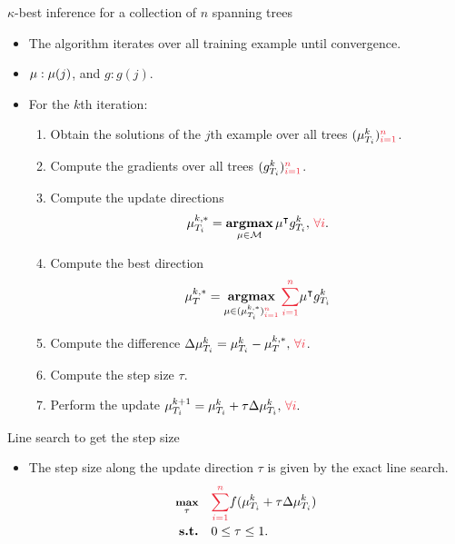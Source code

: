 \documentclass[first=dgreen,second=purple,logo=yellowexc]{aaltoslides}
\begin{document}
\begin{frame}{$\kappa$-best inference for a collection of $n$ spanning trees}
	\begin{itemize}\footnotesize
		\item The algorithm iterates over all training example until convergence.
		\item $\mathbf {\mu}:\mathbf {\mu}(j)$, and $g:g(j)$.
		\item For the $k$th iteration:
		\begin{enumerate}\footnotesize
			\item Obtain the solutions of the $j$th example over all trees $(\vmu_{T_i}^k){\color{aaltored}_{i=1}^n}$.
			\item Compute the gradients over all trees $(g_{T_i}^k){\color{aaltored}_{i=1}^n}$.
			\item Compute the update directions
			\begin{align*}
				{\vmu}_{T_i}^{k,*} = \underset{\vmu\in\Mcal}{\argmax}\,\vmu\tp g_{T_i}^k,\,{\color{aaltored}\forall i}.
			\end{align*}
			\item Compute the best direction
			\begin{align*}
				{\vmu}_{T}^{k,*} = \underset{\vmu\in({\vmu}_{T_i}^{k,*}){\color{aaltored}_{i=1}^n}}{\argmax}\,{\color{aaltored}\sum_{i=1}^n}\vmu\tp g_{T_i}^k
			\end{align*}
			\item Compute the difference $\Delta\vmu_{T_i}^{k} = {\vmu}_{T_i}^{k} - {\vmu}_{T}^{k,*},\,{\color{aaltored}\forall i}$.
			\item Compute the step size $\tau$.
			\item Perform the update $\vmu_{T_i}^{k+1} = \vmu_{T_i}^k + \tau\Delta\vmu_{T_i}^{k},\,{\color{aaltored}\forall i}.$
		\end{enumerate}
	\end{itemize}
\end{frame}

\begin{frame}{Line search to get the step size}
	\begin{itemize}
		\item The step size along the update direction $\tau$ is given by the exact line search.
		\begin{align*}\footnotesize
			\underset{\tau}{\maximize} &\quad {\color{aaltored}\sum_{i=1}^n}f(\vmu_{T_i}^k + \tau\Delta\vmu_{T_i}^{k})\\
			\st &\quad 0\le\tau\le1.
		\end{align*}
	\end{itemize}
\end{frame}
\end{document}
